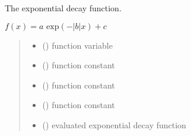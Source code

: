 \documentclass[letterpaper,10pt,english]{sphinxmanual}
\begin{document}
\begin{fulllineitems}
\label{\detokenize{01_utils:skinoptics.utils.exp_decay}}
\pysigstartsignatures
{}
\pysigstopsignatures
\sphinxAtStartPar
The exponential decay function.

\sphinxAtStartPar
\(f(x) = a \mbox{ exp}(-|b|x) + c\)
\begin{quote}\begin{description}
\begin{itemize}
\item {} 
\sphinxAtStartPar
{} () \textendash{} function variable

\item {} 
\sphinxAtStartPar
{} () \textendash{} function constant

\item {} 
\sphinxAtStartPar
{} () \textendash{} function constant

\item {} 
\sphinxAtStartPar
{} () \textendash{} function constant

\end{itemize}

\sphinxAtStartPar
\begin{itemize}
\item {} 
\sphinxAtStartPar
{} () \textendash{} evaluated exponential decay function

\end{itemize}


\end{description}\end{quote}

\end{fulllineitems}
\end{document}
